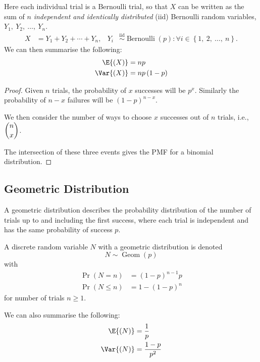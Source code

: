 \documentclass{article}
\begin{document}
Here each individual trial is a Bernoulli trial, so that \(X\) can be written as the sum of
\(n\) \textit{independent and identically distributed} (iid) Bernoulli random variables, \(Y_1,\: Y_2,\: \dots,\: Y_n\).
\begin{align*}
    X & = Y_1 + Y_2 + \cdots + Y_n, & Y_i & \overset{\mathrm{iid}}{\sim} \operatorname{Bernoulli}{\left( p \right)} : \forall i \in \left\{ 1,\: 2,\: \dots,\: n \right\}.
\end{align*}
We can then summarise the following:
\begin{align*}
    \E{\left( X \right)}   & = np                      \\
    \Var{\left( X \right)} & = np \left( 1 - p \right)
\end{align*}
\begin{proof}
    Given \(n\) trials, the probability of \(x\) successes will be \(p^x\).
    Similarly the probability of \(n - x\) failures will be \(\left( 1 - p \right)^{n - x}\).

    We then consider the number of ways to choose \(x\) successes out of \(n\) trials, i.e., \(\dbinom{n}{x}\).

    The intersection of these three events gives the PMF for a binomial distribution.
\end{proof}
\subsection{Geometric Distribution}
A geometric distribution describes the probability distribution of the number of trials up to and including
the first success, where each trial is independent and has the same probability of success \(p\).

A discrete random variable \(N\) with a geometric distribution is denoted
\begin{equation*}
    N \sim \operatorname{Geom}{\left( p \right)}
\end{equation*}
with
\begin{align*}
    \Pr{\left( N = n \right)}    & = \left( 1 - p \right)^{n - 1} p \\
    \Pr{\left( N \leq n \right)} & = 1 - \left( 1 - p \right)^n
\end{align*}
for number of trials \(n \geq 1\).

We can also summarise the following:
\begin{align*}
    \E{\left( N \right)}   & = \frac{1}{p}       \\
    \Var{\left( N \right)} & = \frac{1 - p}{p^2}
\end{align*}
\end{document}
